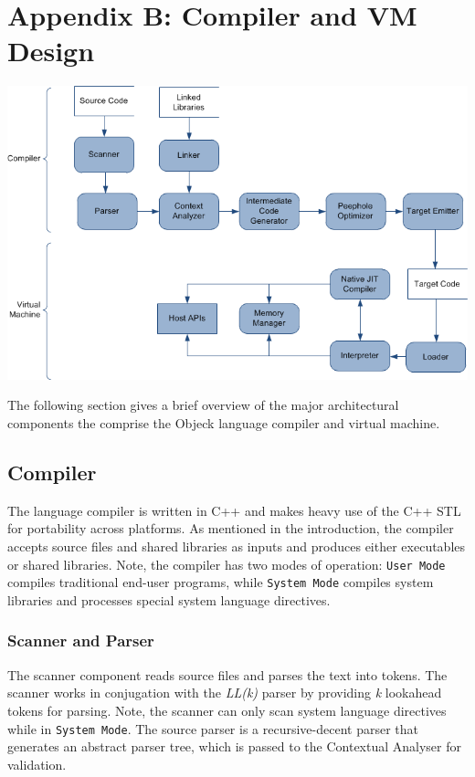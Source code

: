 \documentclass[11pt]{article}
\begin{document}
\section{Appendix B: Compiler and VM Design}
\includegraphics[scale=0.60]{../../images/compiler_data_flow.png}

The following section gives a brief overview of the major
architectural components the comprise the Objeck language compiler and
virtual machine.

\subsection{Compiler}
The language compiler is written in C++ and makes heavy use of the C++
STL for portability across platforms.  As mentioned in the
introduction, the compiler accepts source files and shared libraries
as inputs and produces either executables or shared libraries.  Note,
the compiler has two modes of operation: \texttt{User Mode} compiles
traditional end-user programs, while \texttt{System Mode} compiles
system libraries and processes special system language directives.

\subsubsection{Scanner and Parser}
The scanner component reads source files and parses the text into
tokens.  The scanner works in conjugation with the \emph{LL(k)} parser
by providing \emph{k} lookahead tokens for parsing.  Note, the scanner
can only scan system language directives while in \texttt{System
  Mode}.  The source parser is a recursive-decent parser that
generates an abstract parser tree, which is passed to the Contextual
Analyser for validation.
\end{document}
